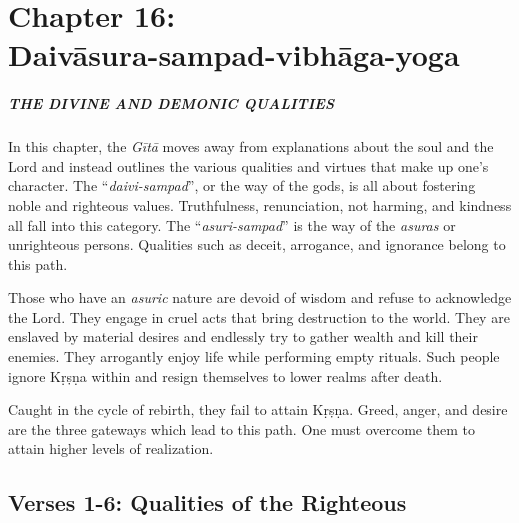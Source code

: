 \chapter{Chapter 16: \\Daivāsura-sampad-vibhāga-yoga}\label{chap-daivasura-sampad-vibhaga-yoga}

\paragraph*{\MakeUppercase{The Divine and Demonic Qualities}}
\noindent In this chapter, the \textit{Gītā} moves away from explanations about the soul and the Lord and instead outlines the various qualities and virtues that make up one’s character. The \enquote{\textit{daivi-sampad}}, or the way of the gods, is all about fostering noble and righteous values. Truthfulness, renunciation, not harming, and kindness all fall into this category. The \enquote{\textit{asuri-sampad}} is the way of the \textit{asuras} or unrighteous persons. Qualities such as deceit, arrogance, and ignorance belong to this path.

Those who have an \textit{asuric} nature are devoid of wisdom and refuse to acknowledge the Lord. They engage in cruel acts that bring destruction to the world. They are enslaved by material desires and endlessly try to gather wealth and kill their enemies. They arrogantly enjoy life while performing empty rituals. Such people ignore Kṛṣṇa within and resign themselves to lower realms after death.

Caught in the cycle of rebirth, they fail to attain Kṛṣṇa. Greed, anger, and desire are the three gateways which lead to this path. One must overcome them to attain higher levels of realization.

\section{Verses 1-6: Qualities of the Righteous}\label{sec-verses-1-6-qualities-of-the-righteous}

